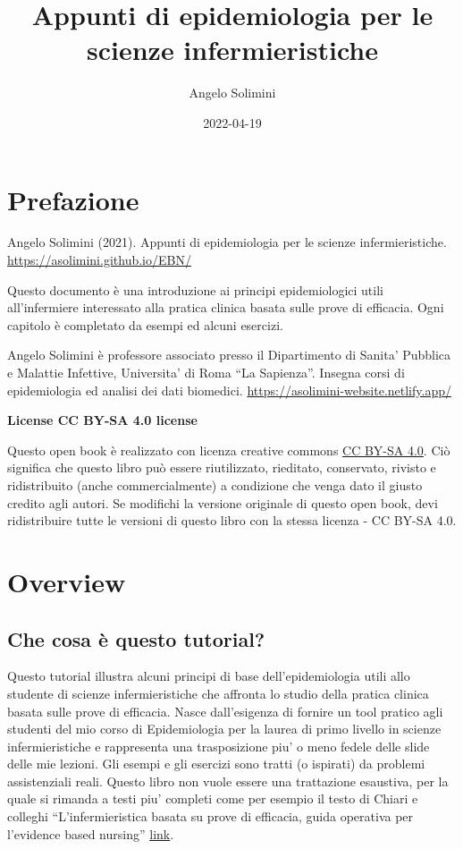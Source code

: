 \documentclass[]{book}
\title{Appunti di epidemiologia per le scienze infermieristiche}
\author{Angelo Solimini}
\date{2022-04-19}
\begin{document}
\maketitle

{
\setcounter{tocdepth}{1}
\tableofcontents
}
\hypertarget{prefazione}{%
\chapter*{Prefazione}\label{prefazione}}

Angelo Solimini (2021). Appunti di epidemiologia per le scienze infermieristiche. \url{https://asolimini.github.io/EBN/}

Questo documento è una introduzione ai principi epidemiologici utili all'infermiere interessato alla pratica clinica basata sulle prove di efficacia. Ogni capitolo è completato da esempi ed alcuni esercizi.

Angelo Solimini è professore associato presso il Dipartimento di Sanita' Pubblica e Malattie Infettive, Universita' di Roma ``La Sapienza''. Insegna corsi di epidemiologia ed analisi dei dati biomedici. \url{https://asolimini-website.netlify.app/}

\textbf{License CC BY-SA 4.0 license}

Questo open book è realizzato con licenza creative commons \href{https://creativecommons.org/licenses/by-sa/4.0/}{CC BY-SA 4.0}. Ciò significa che questo libro può essere riutilizzato, rieditato, conservato, rivisto e ridistribuito (anche commercialmente) a condizione che venga dato il giusto credito agli autori. Se modifichi la versione originale di questo open book, devi ridistribuire tutte le versioni di questo libro con la stessa licenza - CC BY-SA 4.0.

\hypertarget{overview}{%
\chapter{Overview}\label{overview}}

\hypertarget{che-cosa-uxe8-questo-tutorial}{%
\section{Che cosa è questo tutorial?}\label{che-cosa-uxe8-questo-tutorial}}

Questo tutorial illustra alcuni principi di base dell'epidemiologia utili allo studente di scienze infermieristiche che affronta lo studio della pratica clinica basata sulle prove di efficacia. Nasce dall'esigenza di fornire un tool pratico agli studenti del mio corso di Epidemiologia per la laurea di primo livello in scienze infermieristiche e rappresenta una trasposizione piu' o meno fedele delle slide delle mie lezioni. Gli esempi e gli esercizi sono tratti (o ispirati) da problemi assistenziali reali. Questo libro non vuole essere una trattazione esaustiva, per la quale si rimanda a testi piu' completi come per esempio il testo di Chiari e colleghi ``L'infermieristica basata su prove di efficacia, guida operativa per l'evidence based nursing'' \href{https://www.mheducation.it/evidence-based-clinical-practice-2-ed-9788838636738-italy}{link}.
\end{document}
